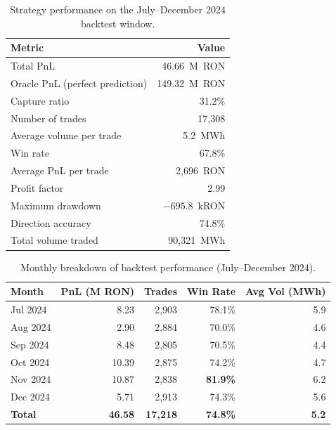 \documentclass{article}
\begin{document}
\begin{table}[H]
\centering
\caption{Strategy performance on the July--December 2024 backtest window.}
\label{tab:kpi}
\begin{tabular}{lr}
\toprule
\textbf{Metric} & \textbf{Value} \\
\midrule
Total PnL & 46.66~M~RON \\
Oracle PnL (perfect prediction) & 149.32~M~RON \\
Capture ratio & 31.2\% \\
Number of trades & 17{,}308 \\
Average volume per trade & 5.2~MWh \\
Win rate & 67.8\% \\
Average PnL per trade & 2{,}696~RON \\
Profit factor & 2.99 \\
Maximum drawdown & $-695.8$~kRON \\
Direction accuracy & 74.8\% \\
Total volume traded & 90{,}321~MWh \\
\bottomrule
\end{tabular}
\end{table}

\begin{table}[!htbp]
\centering
\caption{Monthly breakdown of backtest performance (July--December 2024).}
\label{tab:monthly}
\begin{tabular}{lrrrr}
\toprule
\textbf{Month} & \textbf{PnL (M RON)} & \textbf{Trades} & \textbf{Win Rate} & \textbf{Avg Vol (MWh)} \\
\midrule
Jul 2024 & 8.23  & 2{,}903 & 78.1\% & 5.9 \\
Aug 2024 & 2.90  & 2{,}884 & 70.0\% & 4.6 \\
Sep 2024 & 8.48  & 2{,}805 & 70.5\% & 4.4 \\
Oct 2024 & 10.39 & 2{,}875 & 74.2\% & 4.7 \\
Nov 2024 & 10.87 & 2{,}838 & \textbf{81.9\%} & 6.2 \\
Dec 2024 & 5.71  & 2{,}913 & 74.3\% & 5.6 \\
\midrule
\textbf{Total} & \textbf{46.58} & \textbf{17{,}218} & \textbf{74.8\%} & \textbf{5.2} \\
\bottomrule
\end{tabular}
\end{table}
\end{document}
